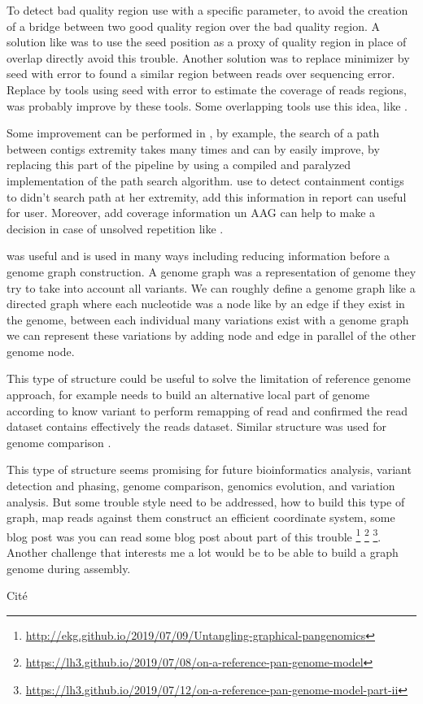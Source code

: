 \documentclass[main.tex]{subfiles}
\begin{document}
To detect bad quality region \yacrd use \minimap with a specific parameter, to avoid the creation of a bridge between two good quality region over the bad quality region. A solution like \miniscrub was to use the seed position as a proxy of quality region in place of overlap directly avoid this trouble. Another solution was to replace minimizer by seed with error to found a similar region between reads over sequencing error. Replace \minimap by tools using seed with error to estimate the coverage of reads regions, was probably improve by these tools. Some overlapping tools use this idea, like \cite{GroupK}.

Some improvement can be performed in \knot, by example, the search of a path between contigs extremity takes many times and can by easily improve, by replacing this part of the pipeline by using a compiled and paralyzed implementation of the path search algorithm. \knot use \minimap to detect containment contigs to didn't search path at her extremity, add this information in \knot report can useful for user. Moreover, add coverage information un AAG can help to make a decision in case of unsolved repetition like \flye.

\fpa was useful and is used in many ways including reducing information before a genome graph construction. A genome graph was a representation of genome they try to take into account all variants. We can roughly define a genome graph like a directed graph where each nucleotide was a node like by an edge if they exist in the genome, between each individual many variations exist with a genome graph we can represent these variations by adding node and edge in parallel of the other genome node.

This type of structure could be useful to solve the limitation of reference genome approach, for example  \cite{whatshap} needs to build an alternative local part of genome according to know variant to perform remapping of read and confirmed the read dataset contains effectively the reads dataset. Similar structure was used for genome comparison  \cite{cactus_graph}.

This type of structure seems promising for future bioinformatics analysis, variant detection and phasing, genome comparison,  genomics evolution, and variation analysis. But some trouble style need to be addressed, how to build this type of graph, map reads against them construct an efficient coordinate system, some blog post was you can read some blog post about part of this trouble \footnote{\url{http://ekg.github.io/2019/07/09/Untangling-graphical-pangenomics}} \footnote{\url{https://lh3.github.io/2019/07/08/on-a-reference-pan-genome-model}} \footnote{\url{https://lh3.github.io/2019/07/12/on-a-reference-pan-genome-model-part-ii}}. Another challenge that interests me a lot would be to be able to build a graph genome during assembly.


Cité \cite{goodbye_ref_hello_graphs}




\end{document}
